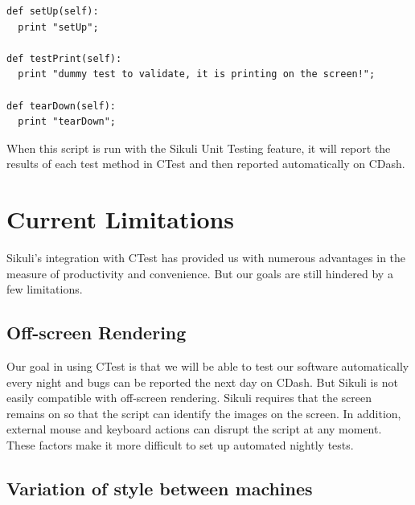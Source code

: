 \documentclass{InsightArticle}
\begin{document}
\begin{verbatim}
def setUp(self):
  print "setUp";

def testPrint(self):
  print "dummy test to validate, it is printing on the screen!";

def tearDown(self):
  print "tearDown";
\end{verbatim}

When this script is run with the Sikuli Unit Testing feature, it will report the
results of each test method in CTest and then reported automatically on
CDash.

\section{Current Limitations}
\label{sec:Limitations}

Sikuli's integration with CTest has provided us with numerous advantages in the
measure of productivity and convenience. But our goals are still
hindered by a few limitations.


\subsection{Off-screen Rendering}

Our goal in using CTest is that we will be able to test our software 
automatically every night and bugs can be reported the next day on CDash. 
But Sikuli is not easily compatible with off-screen rendering. Sikuli 
requires that the screen remains on so that the script can identify the 
images on the screen. In addition, external mouse and keyboard actions can 
disrupt the script at any moment. These factors make it more difficult to 
set up automated nightly tests.

\subsection{Variation of style between machines}
\end{document}
